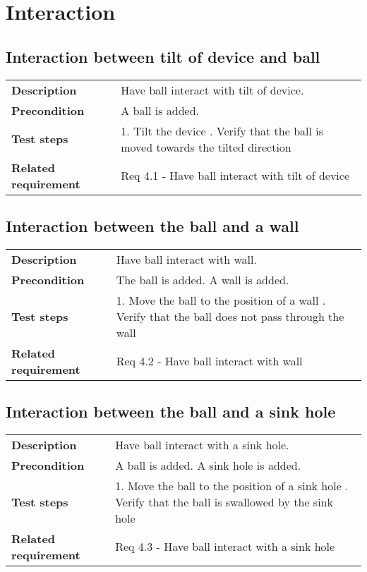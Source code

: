 \documentclass[a4paper,titlepage]{article}
\begin{document}
\section{Interaction}
\subsection{Interaction between tilt of device and ball}
\begin{tabularx}{\textwidth}{lX}
	\textbf{Description}	&
		Have ball interact with tilt of device.\\
	\textbf{Precondition}	&
		A ball is added.\\
	\textbf{Test steps}	&
		1. Tilt the device \newline
		2. Verify that the ball is moved towards the tilted direction\\
	\textbf{Related requirement}	&
		Req 4.1 - Have ball interact with tilt of device \\
\end{tabularx}

\subsection{Interaction between the ball and a wall}
\begin{tabularx}{\textwidth}{lX}
	\textbf{Description}	&
		Have ball interact with wall.\\
	\textbf{Precondition}	&
		The ball is added.\newline
		A wall is added.\\
	\textbf{Test steps}	&
		1. Move the ball to the position of a wall \newline
		2. Verify that the ball does not pass through the wall \\
	\textbf{Related requirement}	&
		Req 4.2 - Have ball interact with wall \\
\end{tabularx}

\subsection{Interaction between the ball and a sink hole}
\begin{tabularx}{\textwidth}{lX}
	\textbf{Description}	&
		Have ball interact with a sink hole.\\
	\textbf{Precondition}	&
		A ball is added.\newline
		A sink hole is added. \\
	\textbf{Test steps}	&
		1. Move the ball to the position of a sink hole \newline
		2. Verify that the ball is swallowed by the sink hole \\
	\textbf{Related requirement}	&
		Req 4.3 - Have ball interact with a sink hole \\
\end{tabularx}
\end{document}

